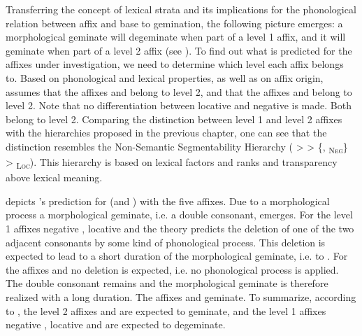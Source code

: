 Transferring the concept of lexical strata and its implications for the phonological relation between affix and base to {gemination}, the following picture emerges: a morphological geminate will degeminate when part of a level 1 affix, and it will geminate when part of a level 2 affix (see \citealt[18]{Mohanan.1986}). To find out what is predicted for the affixes under investigation, we need to determine which level each affix belongs to. 
Based on phonological and lexical properties, as well as on affix origin,  assumes that the affixes  and  belong to level 2, and that the affixes  and  belong to level 2. Note that no differentiation between locative and negative  is made. Both belong to level 2.
Comparing the distinction between level 1 and level 2 affixes with the  hierarchies proposed in the previous chapter, one can see that the distinction resembles the Non-Semantic Segmentability Hierarchy ( >  > \{, \textsubscript{\textsc{Neg}}\} >  \textsubscript{\textsc{Loc}}). This hierarchy is based on lexical factors and ranks  and transparency above lexical meaning.  


 depicts 's prediction for  (and ) with the five affixes. Due to a morphological process a morphological geminate, i.e. a double consonant, emerges. For the level 1 affixes negative , locative  and  the theory predicts the deletion of one of the two adjacent consonants by some kind of phonological process. This deletion is expected to lead to a short duration of the morphological geminate, i.e. to . For the affixes  and  no deletion is expected, i.e. no phonological process is applied. The double consonant remains and the morphological geminate is therefore realized with a long duration. The affixes  and  geminate.  
To summarize, according to , the level 2 affixes  and  are expected to geminate, and the level 1 affixes negative , locative  and  are expected to degeminate. 

